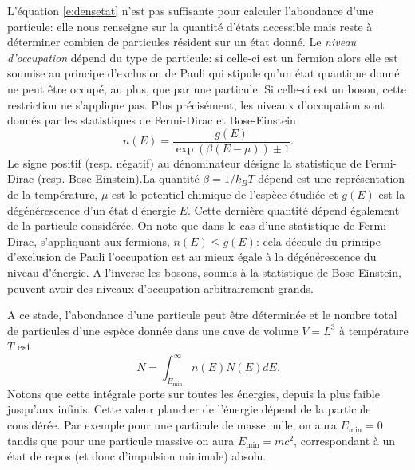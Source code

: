 L'équation \ref{e:densetat} n'est pas suffisante pour calculer l'abondance d'une particule: elle nous renseigne sur la quantité d'états accessible mais reste à déterminer combien de particules résident sur un état donné. Le \textit{niveau d'occupation} dépend du type de particule: si celle-ci est un fermion alors elle est soumise au principe d'exclusion de Pauli qui stipule qu'un état quantique donné ne peut être occupé, au plus, que par une particule. Si celle-ci est un boson, cette restriction ne s'applique pas. Plus précisément, les niveaux d'occupation sont donnés par les statistiques de Fermi-Dirac et Bose-Einstein
\begin{equation}
n(E)=\frac{g(E)}{\exp(\beta(E-\mu))\pm 1}.
\label{e:BEFD}
\end{equation}
Le signe positif (resp. négatif) au dénominateur désigne la statistique de Fermi-Dirac (resp. Bose-Einstein).La quantité $\beta=1/k_B T$ dépend est une représentation de la température, $\mu$ est le potentiel chimique de l'espèce étudiée et $g(E)$ est la dégénérescence d'un état d'énergie $E$. Cette dernière quantité dépend également de la particule considérée. On note que dans le cas d'une statistique de Fermi-Dirac, s'appliquant aux fermions, $n(E)\le g(E)$: cela découle du principe d'exclusion de Pauli l'occupation est au mieux égale à la dégénérescence du niveau d'énergie. A l'inverse les bosons, soumis à la statistique de Bose-Einstein, peuvent avoir des niveaux d'occupation arbitrairement grands.

A ce stade, l'abondance d'une particule peut être déterminée et le nombre total de particules d'une espèce donnée dans une cuve de volume $V=L^3$ à température $T$ est
\begin{equation}
N=\int_{E_{\mathrm{min}}}^\infty n(E)N(E) dE.
\label{e:abondance}
\end{equation}
Notons que cette intégrale porte sur toutes les énergies, depuis la plus faible jusqu'aux infinis. Cette valeur plancher de l'énergie dépend de la particule considérée. Par exemple pour une particule de masse nulle, on aura $E_\mathrm{min}=0$ tandis que pour une particule massive on aura $E_\mathrm{min}=mc^2$, correspondant à un état de repos (et donc d'impulsion minimale) absolu.

